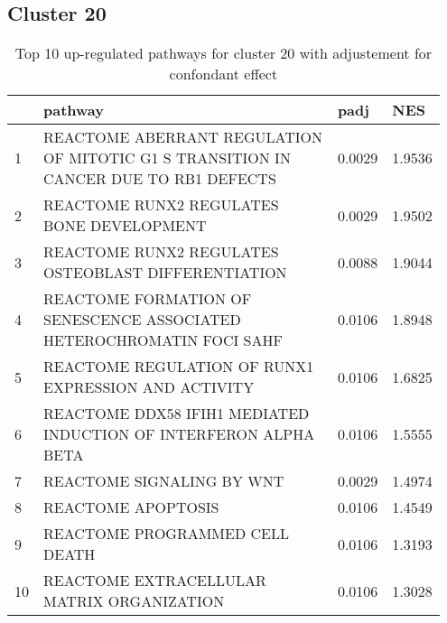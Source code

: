 \documentclass{article}
\begin{document}
\subsection{Cluster 20 }
\begin{table}[H]
\centering
\begin{tabular}{p{0.05\linewidth}p{0.7\linewidth}p{0.1\linewidth}p{0.1\linewidth}}
  \hline
 & pathway & padj & NES \\ 
  \hline
1 & REACTOME ABERRANT REGULATION OF MITOTIC G1 S TRANSITION IN CANCER DUE TO RB1 DEFECTS & 0.0029 & 1.9536 \\ 
  2 & REACTOME RUNX2 REGULATES BONE DEVELOPMENT & 0.0029 & 1.9502 \\ 
  3 & REACTOME RUNX2 REGULATES OSTEOBLAST DIFFERENTIATION & 0.0088 & 1.9044 \\ 
  4 & REACTOME FORMATION OF SENESCENCE ASSOCIATED HETEROCHROMATIN FOCI SAHF & 0.0106 & 1.8948 \\ 
  5 & REACTOME REGULATION OF RUNX1 EXPRESSION AND ACTIVITY & 0.0106 & 1.6825 \\ 
  6 & REACTOME DDX58 IFIH1 MEDIATED INDUCTION OF INTERFERON ALPHA BETA & 0.0106 & 1.5555 \\ 
  7 & REACTOME SIGNALING BY WNT & 0.0029 & 1.4974 \\ 
  8 & REACTOME APOPTOSIS & 0.0106 & 1.4549 \\ 
  9 & REACTOME PROGRAMMED CELL DEATH & 0.0106 & 1.3193 \\ 
  10 & REACTOME EXTRACELLULAR MATRIX ORGANIZATION & 0.0106 & 1.3028 \\ 
   \hline
\end{tabular}
\caption{Top 10 up-regulated pathways for cluster 20 with adjustement for confondant effect} 
\label{tab:q3_2_conf_20}
\end{table}
\end{document}
